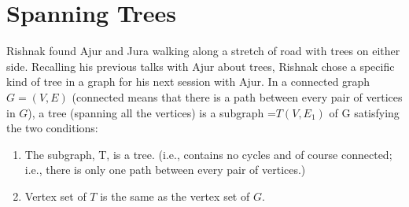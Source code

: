\chapter{Spanning Trees}
Rishnak found Ajur and Jura walking along a stretch of road with trees on either side. Recalling his previous talks with Ajur about trees, Rishnak chose a specific kind of tree in a graph for his next session with Ajur.
In a connected graph $G=(V,E)$ (connected means that there is a path between every pair of vertices in $G$), a tree (spanning all the vertices) is a subgraph =$T(V,E_1)$ of G satisfying the two conditions:
\begin{enumerate}
    \item The subgraph, T,  is a tree. (i.e., contains no cycles and of course connected; i.e., there is only one path between every pair of vertices.)
    \item Vertex set of $T$ is the same as the vertex set of $G$.
\end{enumerate}

